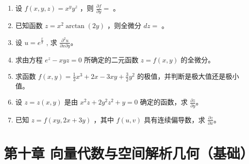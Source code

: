 \documentclass[12pt, a4paper]{article}
\begin{document}
\begin{enumerate}
    \item 设 $ f(x, y, z) = x^{y}y^{z} $ ，则 $ \frac{\partial f}{\partial y} = $ \underline{\hspace{2cm}}。

    \item 已知函数 $ z = x^{2} \arctan(2y) $ ，则全微分 $ dz = $ \underline{\hspace{2cm}}。

    \item 设 $ u = e^{\frac{x}{y}} $ , 求 $ \frac{\partial^{2}u}{\partial x \partial y} $。

    \item 求由方程 $ e^{z}-xyz=0 $ 所确定的二元函数 $ z=f(x,y) $ 的全微分。

    \item 求函数 $ f(x,y)=\frac{1}{3}x^{3}+2x-3xy+\frac{3}{2}y^{2} $ 的极值，并判断是极大值还是极小值。

    \item 设 $ z = z(x, y) $ 是由 $ x^{2}z + 2y^{2}z^{2} + y = 0 $ 确定的函数，求 $ \frac{\partial z}{\partial y} $。

    \item 已知 $ z = f(xy, 2x + 3y) $ ，其中 $ f(u, v) $ 具有连续偏导数，求 $ \frac{\partial z}{\partial x} $。
\end{enumerate}

\section*{第十章 向量代数与空间解析几何（基础）}
\end{document}
